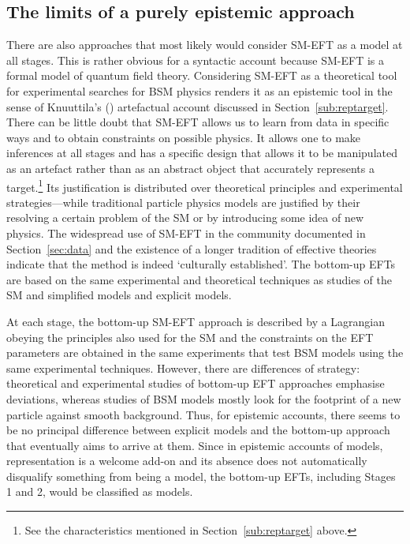 \subsection{The limits of a purely epistemic approach} \label{sub:epistemic}

There are also approaches that most likely would consider SM-EFT as a model at all stages. 
This is rather obvious for a syntactic account because SM-EFT is a formal model of quantum field theory. 
Considering SM-EFT as a theoretical tool for experimental searches for BSM physics renders it as an epistemic tool in the sense of Knuuttila's (\citeyear{knuuttila2011,Knuuttila2017}) artefactual account discussed in Section~\ref{sub:reptarget}.  
There can be little doubt that SM-EFT allows us to learn from data in specific ways and to obtain constraints on possible physics.
It allows one to make inferences at all stages and has a specific design that allows it to be manipulated as an artefact rather than as an abstract object that accurately represents a target.\footnote{See the characteristics mentioned in Section~\ref{sub:reptarget} above.} 
Its justification is distributed over theoretical principles and experimental strategies---while traditional particle physics models are justified by their resolving a certain problem of the SM or by introducing some idea of new physics.
The widespread use of SM-EFT in the community documented in Section~\ref{sec:data} and the existence of a longer tradition of effective theories \citep{wells2012} indicate that the method is indeed `culturally established'. 
The bottom-up EFTs are based on the same experimental and theoretical techniques as studies of the SM and simplified models and explicit models. 

At each stage, the bottom-up SM-EFT approach is described by a Lagrangian 
obeying the principles also used for the SM and the constraints on the EFT parameters are obtained in the same experiments that test BSM models using the same experimental techniques. 
However, there are differences of strategy: theoretical and experimental studies of bottom-up EFT approaches emphasise deviations, whereas studies of BSM models mostly look for the footprint of a new particle against smooth background.
Thus, for epistemic accounts, there seems to be no principal difference between explicit models and the bottom-up approach that eventually aims to arrive at them. 
Since in epistemic accounts of models, representation is a welcome add-on and its absence does not automatically disqualify something from being a model, the bottom-up EFTs, including Stages 1 and 2, would be classified as models.


